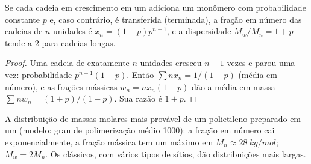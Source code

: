 \begin{proposition}\label{prop:b3:homogeneous-catalysis:schulz-flory}
Se cada cadeia em crescimento em um  adiciona um monômero com probabilidade
constante $p$ e, caso contrário, é transferida (terminada), a fração em número das
cadeias de $n$ unidades é $x_n = (1 - p)p^{n-1}$, e a dispersidade $M_w/M_n = 1 + p$ tende a 2 para cadeias longas.
\end{proposition}

\begin{proof}
Uma cadeia de exatamente $n$ unidades cresceu $n - 1$ vezes e parou uma vez:
probabilidade $p^{n-1}(1 - p)$. Então $\sum nx_n = 1/(1 - p)$ (média em número), e as frações
mássicas $w_n = nx_n(1 - p)$ dão a média em massa $\sum nw_n = (1 + p)/(1 - p)$. Sua
razão é $1 + p$.
\end{proof}

\begin{omfigure}

{\small A distribuição de massas molares mais provável de um polietileno preparado em um
 (modelo: grau de polimerização médio 1000): a fração em
número cai exponencialmente, a fração mássica tem um máximo em $M_n \approx \qty{28}{kg/mol}$; $M_w = 2M_n$. Os
 clássicos, com vários tipos de sítios, dão
distribuições mais largas.}
\end{omfigure}

